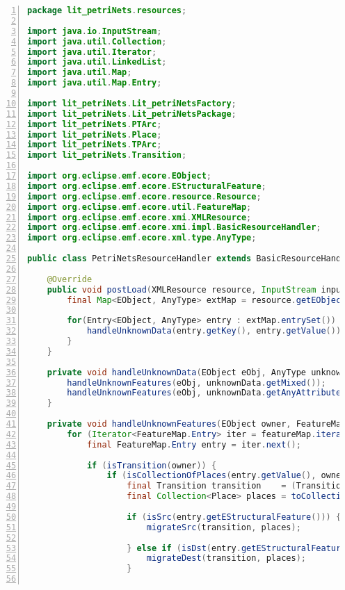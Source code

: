 \begin{lstlisting}[basicstyle=\ttfamily\footnotesize, flexiblecolumns=true, numbers=left, nolol=true, caption=Resource handler for migrating Petri net models., label=lst:petri_nets_resource_handler, language=Java, tabsize=2]
package lit_petriNets.resources;

import java.io.InputStream;
import java.util.Collection;
import java.util.Iterator;
import java.util.LinkedList;
import java.util.Map;
import java.util.Map.Entry;

import lit_petriNets.Lit_petriNetsFactory;
import lit_petriNets.Lit_petriNetsPackage;
import lit_petriNets.PTArc;
import lit_petriNets.Place;
import lit_petriNets.TPArc;
import lit_petriNets.Transition;

import org.eclipse.emf.ecore.EObject;
import org.eclipse.emf.ecore.EStructuralFeature;
import org.eclipse.emf.ecore.resource.Resource;
import org.eclipse.emf.ecore.util.FeatureMap;
import org.eclipse.emf.ecore.xmi.XMLResource;
import org.eclipse.emf.ecore.xmi.impl.BasicResourceHandler;
import org.eclipse.emf.ecore.xml.type.AnyType;

public class PetriNetsResourceHandler extends BasicResourceHandler {

	@Override
	public void postLoad(XMLResource resource, InputStream inputStream, Map<?, ?> options) {
		final Map<EObject, AnyType> extMap = resource.getEObjectToExtensionMap();
		
		for(Entry<EObject, AnyType> entry : extMap.entrySet()) {
			handleUnknownData(entry.getKey(), entry.getValue());
		}
	}

	private void handleUnknownData(EObject eObj, AnyType unknownData) {
		handleUnknownFeatures(eObj, unknownData.getMixed());
		handleUnknownFeatures(eObj, unknownData.getAnyAttribute());
	}

	private void handleUnknownFeatures(EObject owner, FeatureMap featureMap) {
		for (Iterator<FeatureMap.Entry> iter = featureMap.iterator(); iter.hasNext();) {
			final FeatureMap.Entry entry = iter.next();
			
			if (isTransition(owner)) {
				if (isCollectionOfPlaces(entry.getValue(), owner.eResource())) {
					final Transition transition    = (Transition)owner;
					final Collection<Place> places = toCollectionOfPlaces(entry.getValue(), owner.eResource());
					
					if (isSrc(entry.getEStructuralFeature())) {
						migrateSrc(transition, places);
						
					} else if (isDst(entry.getEStructuralFeature())) {
						migrateDest(transition, places);
					}
					

\end{lstlisting}
